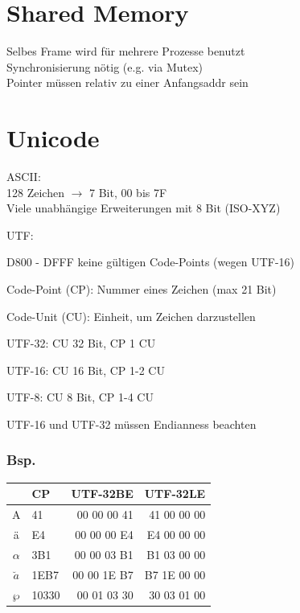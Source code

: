 \begin{multicols*}{5}
\vspace{-7pt}

\section{Shared Memory}
\textcolor{h}{Selbes Frame} wird für mehrere Prozesse benutzt\\
\textcolor{h}{Synchronisierung} nötig (e.g. via Mutex)\\
\textcolor{h}{Pointer} müssen relativ zu einer Anfangsaddr sein



\vspace{-7pt}

\section{Unicode}

\textcolor{h}{ASCII:}\\
128 Zeichen $\rightarrow$ 7 Bit, 00 bis 7F\\
Viele unabhängige Erweiterungen mit 8 Bit (ISO-XYZ)

\textcolor{h}{UTF:}
\begin{compactitem}[$\bullet$]
	\item D800 - DFFF keine gültigen Code-Points (wegen UTF-16)
	\item Code-Point (CP): Nummer eines Zeichen (max 21 Bit)
	\item Code-Unit (CU): Einheit, um Zeichen darzustellen
	\item UTF-32: CU 32 Bit, CP 1 CU
	\item UTF-16: CU 16 Bit, CP 1-2 CU
	\item UTF-8: CU 8 Bit, CP 1-4 CU
	\item UTF-16 und UTF-32 müssen Endianness beachten
\end{compactitem}



\subsubsection{Bsp.}
\vspace{-2pt}
\begin{tabular}{c p{.82cm} | r | r}
	\hline
	&CP&UTF-32BE&UTF-32LE\\
	\hline
	A&41&00 00 00 41&41 00 00 00\\
	ä&E4&00 00 00 E4&E4 00 00 00\\
	$\alpha$&3B1& 00 00 03 B1& B1 03 00 00\\
	$\breve{a}$&1EB7&00 00 1E B7& B7 1E 00 00\\
	$\wp$&10330& 00 01 03 30& 30 03 01 00 \\
	\hline
	

\end{tabular}
\end{multicols*}
